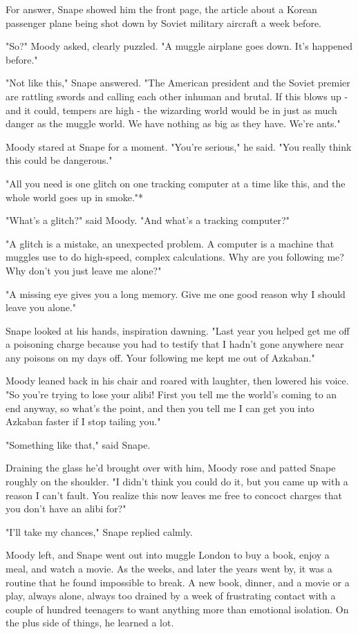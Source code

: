 \documentclass[a4paper,11pt]{article}
\begin{document}
For answer, Snape showed him the front page, the article about a Korean passenger plane being shot down by Soviet military aircraft a week before.

"So?" Moody asked, clearly puzzled. "A muggle airplane goes down. It's happened before."

"Not like this," Snape answered. "The American president and the Soviet premier are rattling swords and calling each other inhuman and brutal. If this blows up - and it could, tempers are high - the wizarding world would be in just as much danger as the muggle world. We have nothing as big as they have. We're ants."

Moody stared at Snape for a moment. "You're serious," he said. "You really think this could be dangerous."

"All you need is one glitch on one tracking computer at a time like this, and the whole world goes up in smoke."*

"What's a glitch?" said Moody. "And what's a tracking computer?"

"A glitch is a mistake, an unexpected problem. A computer is a machine that muggles use to do high-speed, complex calculations. Why are you following me? Why don't you just leave me alone?"

"A missing eye gives you a long memory. Give me one good reason why I should leave you alone."

Snape looked at his hands, inspiration dawning. "Last year you helped get me off a poisoning charge because you had to testify that I hadn't gone anywhere near any poisons on my days off. Your following me kept me out of Azkaban."

Moody leaned back in his chair and roared with laughter, then lowered his voice. "So you're trying to lose your alibi! First you tell me the world's coming to an end anyway, so what's the point, and then you tell me I can get you into Azkaban faster if I stop tailing you."

"Something like that," said Snape.

Draining the glass he'd brought over with him, Moody rose and patted Snape roughly on the shoulder. "I didn't think you could do it, but you came up with a reason I can't fault. You realize this now leaves me free to concoct charges that you don't have an alibi for?"

"I'll take my chances," Snape replied calmly.

Moody left, and Snape went out into muggle London to buy a book, enjoy a meal, and watch a movie. As the weeks, and later the years went by, it was a routine that he found impossible to break. A new book, dinner, and a movie or a play, always alone, always too drained by a week of frustrating contact with a couple of hundred teenagers to want anything more than emotional isolation. On the plus side of things, he learned a lot.
\end{document}
